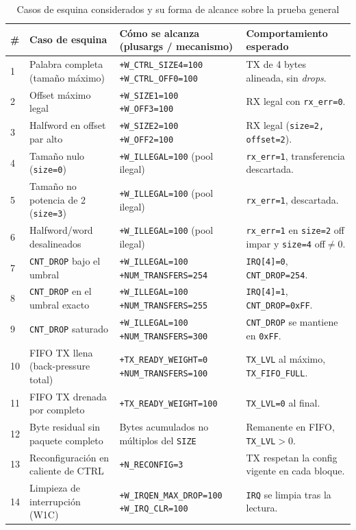 \documentclass[conference]{IEEEtran}
\begin{document}
\begin{table}[t]
\caption{Casos de esquina considerados y su forma de alcance sobre la prueba general}
\label{tab:esquina}
\centering
\footnotesize
\begin{tabular}{@{}p{0.4cm}p{3.6cm}p{6.1cm}p{6.0cm}@{}}
\toprule
\textbf{\#} & \textbf{Caso de esquina} & \textbf{Cómo se alcanza (plusargs / mecanismo)} & \textbf{Comportamiento esperado} \\
\midrule
1  & Palabra completa (tamaño máximo)        & \texttt{+W\_CTRL\_SIZE4=100 +W\_CTRL\_OFF0=100} & TX de 4 bytes alineada, sin \textit{drops}. \\
2  & Offset máximo legal                     & \texttt{+W\_SIZE1=100 +W\_OFF3=100}            & RX legal con \texttt{rx\_err=0}. \\
3  & Halfword en offset par alto             & \texttt{+W\_SIZE2=100 +W\_OFF2=100}            & RX legal (\texttt{size=2, offset=2}). \\
4  & Tamaño nulo (\texttt{size=0})           & \texttt{+W\_ILLEGAL=100} (pool ilegal)         & \texttt{rx\_err=1}, transferencia descartada. \\
5  & Tamaño no potencia de 2 (\texttt{size=3})& \texttt{+W\_ILLEGAL=100} (pool ilegal)        & \texttt{rx\_err=1}, descartada. \\
6  & Halfword/word desalineados              & \texttt{+W\_ILLEGAL=100} (pool ilegal)         & \texttt{rx\_err=1} en \texttt{size=2} off impar y \texttt{size=4} off$\neq$0. \\
7  & \texttt{CNT\_DROP} bajo el umbral       & \texttt{+W\_ILLEGAL=100 +NUM\_TRANSFERS=254}   & \texttt{IRQ[4]=0}, \texttt{CNT\_DROP=254}. \\
8  & \texttt{CNT\_DROP} en el umbral exacto  & \texttt{+W\_ILLEGAL=100 +NUM\_TRANSFERS=255}   & \texttt{IRQ[4]=1}, \texttt{CNT\_DROP=0xFF}. \\
9  & \texttt{CNT\_DROP} saturado             & \texttt{+W\_ILLEGAL=100 +NUM\_TRANSFERS=300}   & \texttt{CNT\_DROP} se mantiene en \texttt{0xFF}. \\
10 & FIFO TX llena (back-pressure total)     & \texttt{+TX\_READY\_WEIGHT=0 +NUM\_TRANSFERS=100} & \texttt{TX\_LVL} al máximo, \texttt{TX\_FIFO\_FULL}. \\
11 & FIFO TX drenada por completo            & \texttt{+TX\_READY\_WEIGHT=100}                & \texttt{TX\_LVL=0} al final. \\
12 & Byte residual sin paquete completo      & Bytes acumulados no múltiplos del \texttt{SIZE} & Remanente en FIFO, \texttt{TX\_LVL}$>$0. \\
13 & Reconfiguración en caliente de CTRL     & \texttt{+N\_RECONFIG=3}                        & TX respetan la config vigente en cada bloque. \\
14 & Limpieza de interrupción (W1C)          & \texttt{+W\_IRQEN\_MAX\_DROP=100 +W\_IRQ\_CLR=100} & \texttt{IRQ} se limpia tras la lectura. \\
\bottomrule
\end{tabular}
\end{table}
\end{document}
